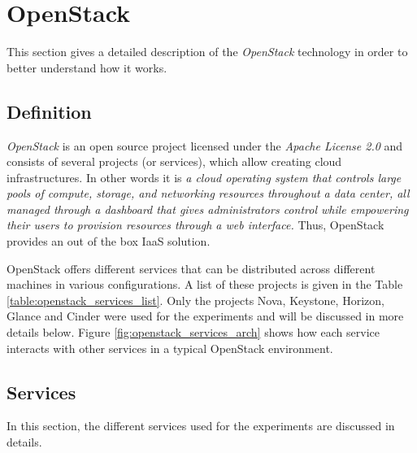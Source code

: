 

\chapter{OpenStack}

This section gives a detailed description of the \textit{OpenStack} technology in order to better understand how it works.


\section{Definition}
\textit{OpenStack} is an open source project licensed under the \textit{Apache License 2.0} and consists of several projects (or services), which allow creating cloud infrastructures.
In other words it is \textit{a cloud operating system that controls large pools of compute, storage, and networking resources throughout a data center, all managed through a dashboard that gives administrators control while empowering their users to provision resources through a web interface.
}\cite{osdef}
Thus, OpenStack provides an out of the box IaaS solution.

OpenStack offers different services that can be distributed across different machines in various configurations.
A list of these projects is given in the Table \ref{table:openstack_services_list}.
Only the projects Nova, Keystone, Horizon, Glance and Cinder were used for the experiments and will be discussed in more details below.
Figure \ref{fig:openstack_services_arch} shows how each service interacts with other services in a typical OpenStack environment.

\section{Services}

In this section, the different services used for the experiments are discussed in details.

